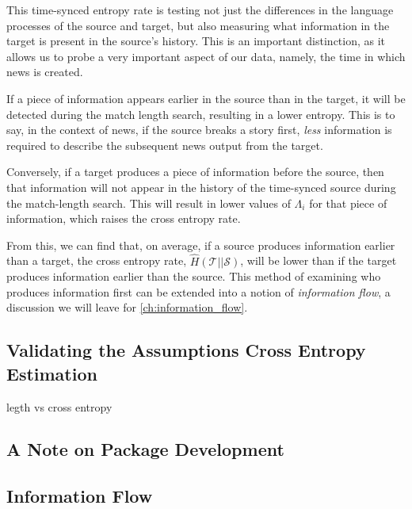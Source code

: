 This time-synced entropy rate is testing not just the differences in the language processes of the source and target, but also measuring what information in the target is present in the source's history. This is an important distinction, as it allows us to probe a very important aspect of our data, namely, the time in which news is created. 

If a piece of information appears earlier in the source than in the target, it will be detected during the match length search, resulting in a lower entropy. This is to say, in the context of news, if the {\color{source}source} breaks a story first, \emph{less} information is required to describe the subsequent news output from the {\color{target}target}. 

Conversely, if a {\color{target}target} produces a piece of information before the {\color{source}source}, then that information will not appear in the history of the time-synced source during the match-length search. This will result in lower values of $\Lambda_i$ for that piece of information, which raises the cross entropy rate.

From this, we can find that, on average, if a {\color{source}source} produces information earlier than a {\color{target}target}, the cross entropy rate, $\hat{H}(\mathcal{T} || \mathcal{S})$, will be lower than if the {\color{target}target} produces information earlier than the {\color{source}source}. This method of examining who produces information first can be extended into a notion of \emph{information flow}, a discussion we will leave for \autoref{ch:information_flow}.



\subsection{Validating the Assumptions Cross Entropy Estimation}
legth vs cross entropy




\subsection{A Note on Package Development}

\subsection{Information Flow}\label{ch:information_flow}


